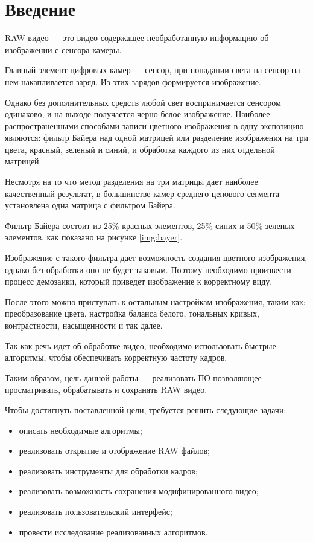 \chapter*{Введение}

RAW видео --- это видео содержащее необработанную информацию об изображении с сенсора камеры.

Главный элемент цифровых камер --- сенсор, при попадании света на сенсор на нем накапливается заряд. Из этих зарядов формируется изображение.

Однако без дополнительных средств любой свет воспринимается сенсором одинаково, и на выходе получается черно-белое изображение. Наиболее распространенными способами записи цветного изображения в одну экспозицию являются: фильтр Байера над одной матрицей или разделение изображения на три цвета, красный, зеленый и синий, и обработка каждого из них отдельной матрицей. \cite{color}

Несмотря на то что метод разделения на три матрицы дает наиболее качественный результат, в большинстве камер среднего ценового сегмента установлена одна матрица с фильтром Байера.

Фильтр Байера состоит из 25\% красных элементов, 25\% синих и 50\% зеленых элементов, как показано на рисунке \ref{img:bayer}.


Изображение с такого фильтра дает возможность создания цветного изображения, однако без обработки оно не будет таковым. Поэтому необходимо произвести процесс демозаики, который приведет изображение к корректному виду. 

После этого можно приступать к остальным настройкам изображения, таким как: преобразование цвета, настройка баланса белого, тональных кривых, контрастности, насыщенности и так далее.

Так как речь идет об обработке видео, необходимо использовать быстрые алгоритмы, чтобы обеспечивать корректную частоту кадров.
 
Таким образом, цель данной работы --- реализовать ПО позволяющее просматривать, обрабатывать и сохранять RAW видео.

Чтобы достигнуть поставленной цели, требуется решить следующие задачи:
\begin{itemize}
	\item описать необходимые алгоритмы;
	\item реализовать открытие и отображение RAW файлов;
	\item реализовать инструменты для обработки кадров;
	\item реализовать возможность сохранения модифицированного видео;
	\item реализовать пользовательский интерфейс;
	\item провести исследование реализованных алгоритмов.
\end{itemize}
